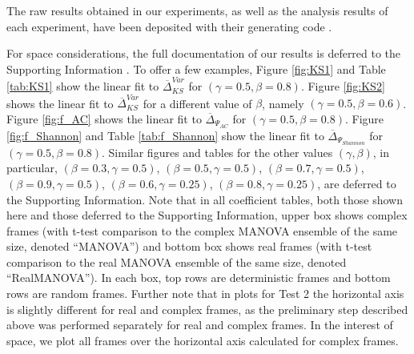 \documentclass[a4paper,12pt]{article}
\newcommand{\specstat}{\ensuremath{\Psi}}
\begin{document}
The raw results obtained in our experiments, as well as the analysis results 
of each experiment, have been deposited with their generating code \cite{SDR}.

For space considerations, the full documentation of our
results is deferred to the
Supporting Information \cite{SI}.
To offer a few examples,
Figure \ref{fig:KS1} and Table \ref{tab:KS1} show the linear fit to $\overline{\Delta}^{Var}_{KS}$ for  $(\gamma=0.5,\beta=0.8)$.
Figure \ref{fig:KS2} %
shows the linear fit to
$\overline{\Delta}^{Var}_{KS}$ for a different value of $\beta$, namely  $(\gamma=0.5,\beta=0.6)$.
Figure \ref{fig:f_AC} %
shows the linear fit to
$\overline{\Delta}_{\specstat_{AC}}$ for  $(\gamma=0.5,\beta=0.8)$.
Figure \ref{fig:f_Shannon} and Table \ref{tab:f_Shannon} show the linear fit to
$\overline{\Delta}_{\specstat_{Shannon}}$ for  $(\gamma=0.5,\beta=0.8)$. Similar figures and tables for the other values $(\gamma,\beta)$, in particular, $(\beta=0.3,\gamma=0.5)$, $(\beta=0.5,\gamma=0.5)$,  $(\beta=0.7,\gamma=0.5)$,  $(\beta=0.9,\gamma=0.5)$, $(\beta=0.6,\gamma=0.25)$, $(\beta=0.8,\gamma=0.25)$, are deferred to the Supporting Information. 
Note that in all coefficient tables, both those shown here and those deferred to the
Supporting Information, upper box shows complex frames (with t-test comparison
to the complex MANOVA ensemble of the same size,
denoted ``MANOVA'') and bottom box shows 
real frames (with t-test comparison to the real MANOVA ensemble of the same
size, denoted ``RealMANOVA'').
In each box, top rows are deterministic frames and bottom rows are random
frames.  Further note that in plots for Test 2 the horizontal axis is slightly
different for real and complex frames, as the preliminary step described above
was performed separately for real and complex frames. In the interest of space,
we plot all frames over the horizontal axis calculated for complex frames.
\end{document}

